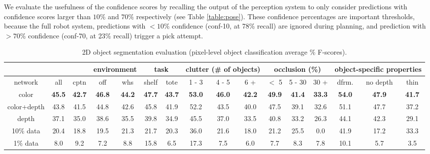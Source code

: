 \documentclass[letterpaper, 10 pt, conference]{ieeeconf}  %
\begin{document}
We evaluate the usefulness of the confidence scores by recalling the output of the perception system to only consider predictions with confidence scores larger than $10\%$ and $70\%$ respectively (see Table \ref{table:pose}). 
These confidence percentages are important thresholds, because the full robot system, predictions with $< 10\%$ confidence (conf-10, at 78\% recall) are ignored during planning, and prediction with $> 70\%$ confidence (conf-70, at 23\% recall) trigger a pick attempt.


\begin{table*}[t]
\vspace{2mm}
  \centering
  \caption{2D object segmentation evaluation (pixel-level object classification average \% F-scores).}
  \vspace{-2mm}
  \begin{tabular}{c|c|c|c|c|c|c|c|c|c|c|c|c|c|c|c}
    \hline
    \multicolumn{3}{c}{ } & \multicolumn{2}{|c}{environment} & \multicolumn{2}{|c}{task} & \multicolumn{3}{|c}{clutter (\# of objects)} & \multicolumn{3}{|c}{occlusion (\%)} & \multicolumn{3}{|c}{object-specific properties} \\\hline
    network & all & cptn & off & whs & shelf & tote & 1 - 3 & 4 - 5 & 6 + & $<$ 5 & 5 - 30 & 30 + & dfrm. & no depth & thin \\\hline
    color & \bf 45.5 & \bf 42.7 & \bf 46.8 & \bf 44.2 & \bf 47.7 & \bf 43.7 & \bf 53.0 & \bf 46.0 & \bf 42.2 & \bf 49.9 & \bf 41.4 & \bf 33.3 & \bf 54.0 & \bf 47.9 & \bf 41.7 \\ 
    color+depth & 43.8 & 41.5 & 44.8 & 42.6 & 45.8 & 41.9 & 52.2 & 43.5 & 40.0 & 47.5 & 39.1 & 32.6 & 51.1 & 47.7 & 37.2 \\
    depth & 37.1 & 35.0 & 38.6 & 35.5 & 39.8 & 34.9 & 45.5 & 37.0 & 33.5 & 40.8 & 33.2 & 26.3 & 44.1 & 42.3 & 29.1\\\hline
    10\% data & 20.4 & 18.8 & 19.5 & 21.3 & 21.7 & 20.3 & 36.0 & 21.6 & 18.0 & 21.2 & 25.5 & 0.0 & 41.9 & 17.2 & 33.3\\
    1\% data & 8.0 & 9.2 & 7.2 & 8.8 & 15.8 & 6.5 & 17.3 & 7.5 & 6.0 & 7.7 & 8.3 & 7.8 & 10.1 & 5.7 & 3.5\\\hline
  \end{tabular}
  \label{table:seg}
\end{table*}
\end{document}
